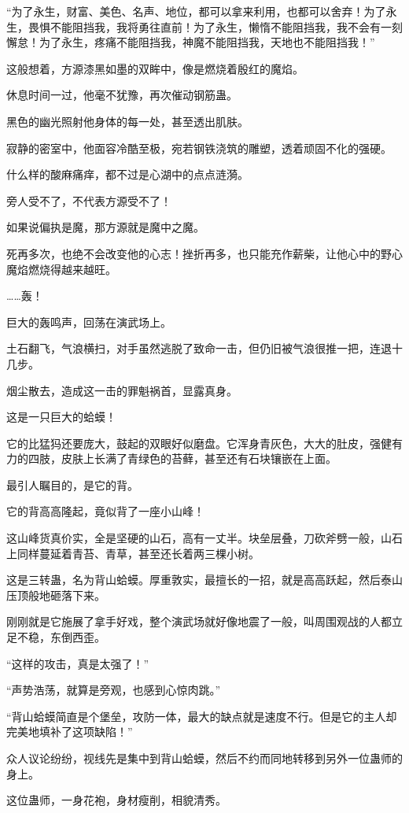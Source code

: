\begin{this_body}
“为了永生，财富、美色、名声、地位，都可以拿来利用，也都可以舍弃！为了永生，畏惧不能阻挡我，我将勇往直前！为了永生，懒惰不能阻挡我，我不会有一刻懈怠！为了永生，疼痛不能阻挡我，神魔不能阻挡我，天地也不能阻挡我！”

这般想着，方源漆黑如墨的双眸中，像是燃烧着殷红的魔焰。

休息时间一过，他毫不犹豫，再次催动钢筋蛊。

黑色的幽光照射他身体的每一处，甚至透出肌肤。

寂静的密室中，他面容冷酷至极，宛若钢铁浇筑的雕塑，透着顽固不化的强硬。

什么样的酸麻痛痒，都不过是心湖中的点点涟漪。

旁人受不了，不代表方源受不了！

如果说偏执是魔，那方源就是魔中之魔。

死再多次，也绝不会改变他的心志！挫折再多，也只能充作薪柴，让他心中的野心魔焰燃烧得越来越旺。

……轰！

巨大的轰鸣声，回荡在演武场上。

土石翻飞，气浪横扫，对手虽然逃脱了致命一击，但仍旧被气浪很推一把，连退十几步。

烟尘散去，造成这一击的罪魁祸首，显露真身。

这是一只巨大的蛤蟆！

它的比猛犸还要庞大，鼓起的双眼好似磨盘。它浑身青灰色，大大的肚皮，强健有力的四肢，皮肤上长满了青绿色的苔藓，甚至还有石块镶嵌在上面。

最引人瞩目的，是它的背。

它的背高高隆起，竟似背了一座小山峰！

这山峰货真价实，全是坚硬的山石，高有一丈半。块垒层叠，刀砍斧劈一般，山石上同样蔓延着青苔、青草，甚至还长着两三棵小树。

这是三转蛊，名为背山蛤蟆。厚重敦实，最擅长的一招，就是高高跃起，然后泰山压顶般地砸落下来。

刚刚就是它施展了拿手好戏，整个演武场就好像地震了一般，叫周围观战的人都立足不稳，东倒西歪。

“这样的攻击，真是太强了！”

“声势浩荡，就算是旁观，也感到心惊肉跳。”

“背山蛤蟆简直是个堡垒，攻防一体，最大的缺点就是速度不行。但是它的主人却完美地填补了这项缺陷！”

众人议论纷纷，视线先是集中到背山蛤蟆，然后不约而同地转移到另外一位蛊师的身上。

这位蛊师，一身花袍，身材瘦削，相貌清秀。


\end{this_body}
